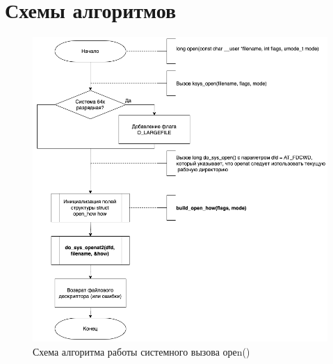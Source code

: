 
\section{Схемы алгоритмов}

\begin{figure}[h!]
	\begin{center}
		\includegraphics[width=\textwidth]{images/open}
	\end{center}
	\caption{Схема алгоритма работы системного вызова ореn() }
	\label{img:open}
\end{figure}


